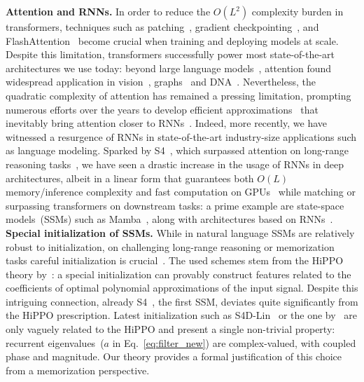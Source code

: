 \textbf{Attention and RNNs.} In order to reduce the $O(L^2)$ complexity burden in transformers, techniques such as patching~\citep{dosovitskiy2021image,pagnoni2024byte}, gradient checkpointing~\citep{chen2016training}, and FlashAttention~\citep{dao2022flashattention, dao2023flashattention} become crucial when training and deploying models at scale. Despite this limitation, transformers successfully power most state-of-the-art architectures we use today: beyond large language models~\citep{brown2020language, team2024gemini}, attention found widespread application in vision~\citep{dosovitskiy2021image}, graphs~\citep{ma2023graph} and DNA~\citep{dalla2024nucleotide}.  Nevertheless, the quadratic complexity of attention has remained a pressing limitation, prompting numerous efforts over the years to develop efficient approximations~\citep{wang2020linformer, choromanski2020rethinking, chen2021skyformer, lee2022fnet} that inevitably bring attention closer to RNNs~\citep{schlag2021linear,katharopoulos2020transformers}. Indeed, more recently, we have witnessed a resurgence of RNNs in state-of-the-art industry-size applications such as language modeling. Sparked by S4~\citep{gu2020hippo, gu2022efficiently}, which surpassed attention on long-range reasoning tasks~\citep{tay2020long}, we have seen a drastic increase in the usage of RNNs in deep architectures, albeit in a linear form that guarantees both $O(L)$ memory/inference complexity and fast computation on GPUs~\citep{martin2018parallelizing} while matching or surpassing transformers on downstream tasks: a prime example are state-space models~(SSMs) such as Mamba~\citep{gu2024mamba}, along with architectures based on RNNs~\citep{de2024griffin, peng2024eagle, yang2024gated}. 
\\[.35cm]
\textbf{Special initialization of SSMs.} While in natural language SSMs are relatively robust to initialization, on challenging long-range reasoning or memorization tasks careful initialization is crucial~\citep{gu2023how,orvieto2023resurrecting,trockman2024mimetic}. The used schemes stem from the HiPPO theory by~\citet{gu2020hippo}: a special initialization can provably construct features related to the coefficients of optimal polynomial approximations of the input signal. Despite this intriguing connection, already S4~\citep{gu2022efficiently}, the first SSM, deviates quite significantly from the HiPPO prescription. Latest initialization such as S4D-Lin~\citep{gu2022parameterization} or the one by~\citet{orvieto2023resurrecting} are only vaguely related to the HiPPO and present a single non-trivial property: recurrent eigenvalues~($a$ in Eq.~\eqref{eq:filter_new}) are complex-valued, with coupled phase and magnitude. Our theory provides a formal justification of this choice from a memorization perspective.
